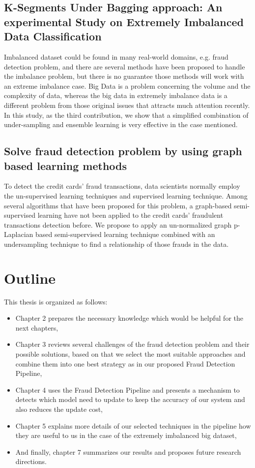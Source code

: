 \subsection*{K-Segments Under Bagging approach: An experimental Study on Extremely Imbalanced Data Classification}

Imbalanced dataset could be found in many real-world domains, e.g. fraud detection problem, and there are several methods have been proposed to handle the imbalance problem, but there is no guarantee those methods will work with an extreme imbalance case. Big Data is a problem concerning the volume and the complexity of data, whereas the big data in extremely imbalance data is a different problem from those original issues that attracts much attention recently. In this study, as the third contribution, we show that a simplified combination of under-sampling and ensemble learning is very effective in the case mentioned.


\subsection*{Solve fraud detection problem by using graph based learning methods}

To detect the credit cards' fraud transactions, data scientists normally employ the un-supervised learning techniques and supervised learning technique. Among several algorithms that have been proposed for this problem, a graph-based semi-supervised learning have not been applied to the credit cards' fraudulent transactions detection before. We propose to apply an un-normalized graph p-Laplacian based semi-supervised learning technique combined with an undersampling technique to find a relationship of those frauds in the data.


\section{Outline}

This thesis is organized as follows:

\begin{itemize}
\item Chapter 2 prepares the necessary knowledge which would be helpful for the next chapters,
\item Chapter 3 reviews several challenges of the fraud detection problem and their possible solutions, based on that we select the most suitable approaches and combine them into one best strategy as in our proposed Fraud Detection Pipeline,
\item Chapter 4 uses the Fraud Detection Pipeline and presents a mechanism to detects which model need to update to keep the accuracy of our system and also reduces the update cost,
\item Chapter 5 explains more details of our selected techniques in the pipeline how they are useful to us in the case of the extremely imbalanced big dataset,
\item And finally, chapter 7 summarizes our results and proposes future research directions.
\end{itemize}
